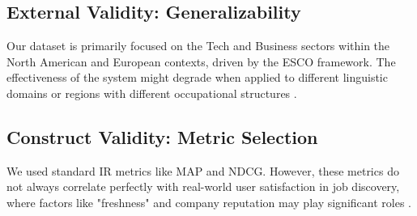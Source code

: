\subsection{External Validity: Generalizability}
Our dataset is primarily focused on the Tech and Business sectors within the North American and European contexts, driven by the ESCO framework. The effectiveness of the system might degrade when applied to different linguistic domains or regions with different occupational structures \cite{kurekova2015using}.

\subsection{Construct Validity: Metric Selection}
We used standard IR metrics like MAP and NDCG. However, these metrics do not always correlate perfectly with real-world user satisfaction in job discovery, where factors like "freshness" and company reputation may play significant roles \cite{baeza2011modern, lacic2020recommender}.
